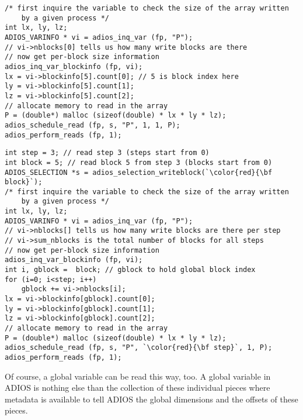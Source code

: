 \begin{lstlisting}[numbers=none, 
                             caption={Read an array written by one specific process, with first checking the size},  
                             label=code:localread2]
/* first inquire the variable to check the size of the array written
    by a given process */
int lx, ly, lz;
ADIOS_VARINFO * vi = adios_inq_var (fp, "P");
// vi->nblocks[0] tells us how many write blocks are there
// now get per-block size information
adios_inq_var_blockinfo (fp, vi);
lx = vi->blockinfo[5].count[0]; // 5 is block index here
ly = vi->blockinfo[5].count[1];
lz = vi->blockinfo[5].count[2];
// allocate memory to read in the array
P = (double*) malloc (sizeof(double) * lx * ly * lz);
adios_schedule_read (fp, s, "P", 1, 1, P);
adios_perform_reads (fp, 1);  
\end{lstlisting}

\begin{lstlisting}[numbers=none, 
                             caption={Read an array written by one specific process, when multiple steps are in a file},  
                             label=code:localread2]
int step = 3; // read step 3 (steps start from 0)
int block = 5; // read block 5 from step 3 (blocks start from 0)
ADIOS_SELECTION *s = adios_selection_writeblock(`\color{red}{\bf block}`); 
/* first inquire the variable to check the size of the array written
    by a given process */
int lx, ly, lz;
ADIOS_VARINFO * vi = adios_inq_var (fp, "P");
// vi->nblocks[] tells us how many write blocks are there per step
// vi->sum_nblocks is the total number of blocks for all steps
// now get per-block size information
adios_inq_var_blockinfo (fp, vi);
int i, gblock =  block; // gblock to hold global block index
for (i=0; i<step; i++)
    gblock += vi->nblocks[i];
lx = vi->blockinfo[gblock].count[0];
ly = vi->blockinfo[gblock].count[1];
lz = vi->blockinfo[gblock].count[2];
// allocate memory to read in the array
P = (double*) malloc (sizeof(double) * lx * ly * lz);
adios_schedule_read (fp, s, "P", `\color{red}{\bf step}`, 1, P);
adios_perform_reads (fp, 1);  
\end{lstlisting}


Of course, a global variable can be read this way, too. A global variable in ADIOS is nothing else than the collection of these individual pieces where metadata is available to tell ADIOS the global dimensions and the offsets of these pieces.





